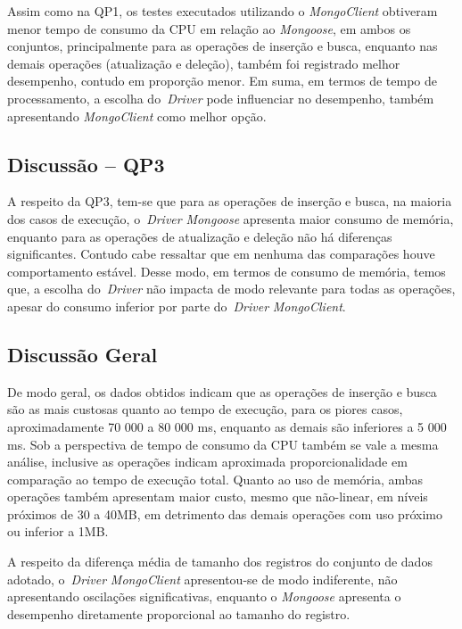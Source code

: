 \documentclass[12pt]{article}
\begin{document}
Assim como na QP1, os testes executados utilizando o \emph{MongoClient} obtiveram menor tempo de consumo da CPU em relação ao \emph{Mongoose}, em ambos os conjuntos, principalmente para as operações de inserção e busca, enquanto nas demais operações (atualização e deleção), também foi registrado melhor desempenho, contudo em proporção menor.
Em suma, em termos de tempo de processamento, a escolha do~\emph{Driver} pode influenciar no desempenho, também apresentando \emph{MongoClient} como melhor opção.

\subsection{Discussão -- QP3}
\label{q3}

A respeito da QP3, tem-se que para as operações de inserção e busca, na maioria dos casos de execução, o~\emph{Driver} \emph{Mongoose} apresenta maior consumo de memória, enquanto para as operações de atualização e deleção não há diferenças significantes.
Contudo cabe ressaltar que em nenhuma das comparações houve comportamento estável.
Desse modo, em termos de consumo de memória, temos que, a escolha do~\emph{Driver} não impacta de modo relevante para todas as operações, apesar do consumo inferior por parte do~\emph{Driver} \emph{MongoClient}.

\subsection{Discussão Geral}
\label{qgeral}

De modo geral, os dados obtidos indicam que as operações de inserção e busca são as mais custosas quanto ao tempo de execução, para os piores casos, aproximadamente 70 000 a 80 000 ms, enquanto as demais são inferiores a 5 000 ms.
Sob a perspectiva de tempo de consumo da CPU também se vale a mesma análise, inclusive as operações indicam aproximada proporcionalidade em comparação ao tempo de execução total.
Quanto ao uso de memória, ambas operações também apresentam maior custo, mesmo que não-linear, em níveis próximos de 30 a 40MB, em detrimento das demais operações com uso próximo ou inferior a 1MB.

A respeito da diferença média de tamanho dos registros do conjunto de dados adotado, o~\emph{Driver} \emph{MongoClient} apresentou-se de modo indiferente, não apresentando oscilações significativas, enquanto o \emph{Mongoose} apresenta o desempenho diretamente proporcional ao tamanho do registro.
\end{document}
